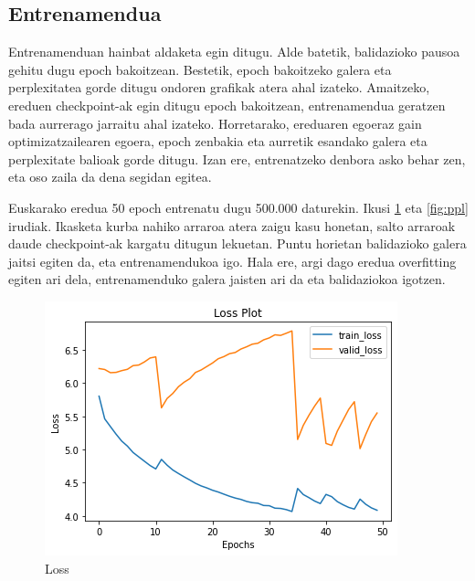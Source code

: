 \documentclass[11pt,a4paper]{article}
\begin{document}
\subsection{Entrenamendua}

Entrenamenduan hainbat aldaketa egin ditugu. Alde batetik, balidazioko pausoa gehitu dugu epoch bakoitzean. Bestetik, epoch bakoitzeko galera eta perplexitatea gorde ditugu ondoren grafikak atera ahal izateko. Amaitzeko, ereduen checkpoint-ak egin ditugu epoch bakoitzean, entrenamendua geratzen bada aurrerago jarraitu ahal izateko. Horretarako, ereduaren egoeraz gain optimizatzailearen egoera, epoch zenbakia eta aurretik esandako galera eta perplexitate balioak gorde ditugu. Izan ere, entrenatzeko denbora asko behar zen, eta oso zaila da dena segidan egitea.

Euskarako eredua 50 epoch entrenatu dugu 500.000 daturekin. Ikusi \ref{fig:loss} eta \ref{fig:ppl} irudiak. Ikasketa kurba nahiko arraroa atera zaigu kasu honetan, salto arraroak daude checkpoint-ak kargatu ditugun lekuetan. Puntu horietan balidazioko galera jaitsi egiten da, eta entrenamendukoa igo. Hala ere, argi dago eredua overfitting egiten ari dela, entrenamenduko galera jaisten ari da eta balidaziokoa igotzen.

\begin{figure}[ht]
    \centering
    \includegraphics[width=\linewidth]{loss}
    \caption{Loss}
    \label{fig:loss}
\end{figure}
\end{document}
